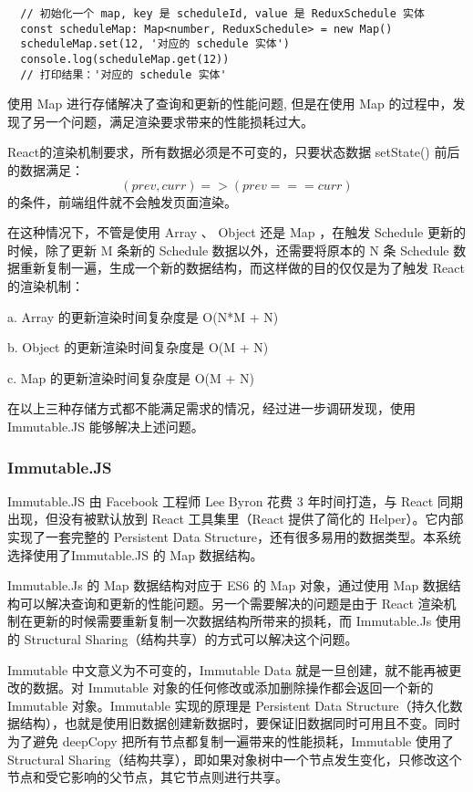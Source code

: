 {\setmainfont{Courier New Bold}
\begin{lstlisting}
  // 初始化一个 map, key 是 scheduleId, value 是 ReduxSchedule 实体
  const scheduleMap: Map<number, ReduxSchedule> = new Map()
  scheduleMap.set(12, '对应的 schedule 实体')
  console.log(scheduleMap.get(12))
  // 打印结果：'对应的 schedule 实体'
 \end{lstlisting}}

  使用 Map 进行存储解决了查询和更新的性能问题, 但是在使用 Map 的过程中，发现了另一个问题，满足渲染要求带来的性能损耗过大。

  React的渲染机制要求，所有数据必须是不可变的，只要状态数据 setState() 前后的数据满足：
  \begin{equation}
    (prev, curr) => (prev === curr)
  \end{equation}
  的条件，前端组件就不会触发页面渲染。

  在这种情况下，不管是使用 Array 、 Object 还是 Map ，在触发 Schedule 更新的时候，除了更新 M 条新的 Schedule 数据以外，还需要将原本的 N 条 Schedule 数据重新复制一遍，生成一个新的数据结构，而这样做的目的仅仅是为了触发 React 的渲染机制：

  \quad{}a. Array 的更新渲染时间复杂度是 O(N*M + N)


  \quad{}b. Object 的更新渲染时间复杂度是 O(M + N)


  \quad{}c. Map 的更新渲染时间复杂度是 O(M + N)

  在以上三种存储方式都不能满足需求的情况，经过进一步调研发现，使用 Immutable.JS 能够解决上述问题。

  \subsubsection{Immutable.JS}
  Immutable.JS 由 Facebook 工程师 Lee Byron 花费 3 年时间打造，与 React 同期出现，但没有被默认放到 React 工具集里（React 提供了简化的 Helper）。它内部实现了一套完整的 Persistent Data Structure，还有很多易用的数据类型。本系统选择使用了Immutable.JS 的 Map 数据结构。

  Immutable.Js 的 Map 数据结构对应于 ES6 的 Map 对象，通过使用 Map 数据结构可以解决查询和更新的性能问题。另一个需要解决的问题是由于 React 渲染机制在更新的时候需要重新复制一次数据结构所带来的损耗，而 Immutable.Js 使用的 Structural Sharing（结构共享）的方式可以解决这个问题。

Immutable 中文意义为不可变的，Immutable Data 就是一旦创建，就不能再被更改的数据。对 Immutable 对象的任何修改或添加删除操作都会返回一个新的 Immutable 对象。Immutable 实现的原理是 Persistent Data Structure（持久化数据结构），也就是使用旧数据创建新数据时，要保证旧数据同时可用且不变。同时为了避免 deepCopy 把所有节点都复制一遍带来的性能损耗，Immutable 使用了 Structural Sharing（结构共享），即如果对象树中一个节点发生变化，只修改这个节点和受它影响的父节点，其它节点则进行共享。

